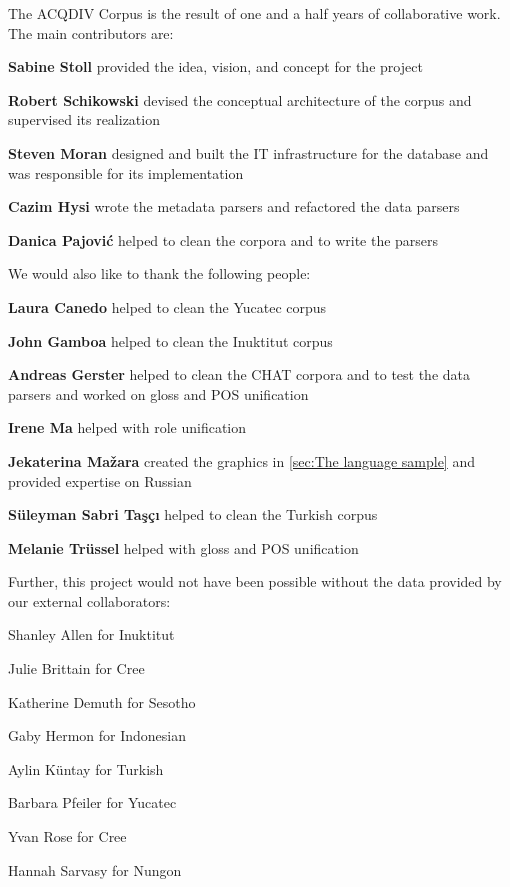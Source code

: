 \documentclass[a4paper, 11pt]{book}
\begin{document}
The ACQDIV Corpus is the result of one and a half years of collaborative work. The main contributors are: 

\begin{itemize*}
	\item \textbf{Sabine Stoll} provided the idea, vision, and concept for the project
	\item \textbf{Robert Schikowski} devised the conceptual architecture of the corpus and supervised its realization 
	\item \textbf{Steven Moran} designed and built the IT infrastructure for the database and was responsible for its implementation
	\item \textbf{Cazim Hysi} wrote the metadata parsers and refactored the data parsers
	\item \textbf{Danica Pajović} helped to clean the corpora and to write the parsers
\end{itemize*}

\noindent We would also like to thank the following people: 

\begin{itemize*}
	\item \textbf{Laura Canedo} helped to clean the Yucatec corpus
	\item \textbf{John Gamboa} helped to clean the Inuktitut corpus
	\item \textbf{Andreas Gerster} helped to clean the CHAT corpora and to test the data parsers and worked on gloss and POS unification
	\item \textbf{Irene Ma} helped with role unification
	\item \textbf{Jekaterina Mažara} created the graphics in \autoref{sec:The language sample} and provided expertise on Russian
	\item \textbf{Süleyman Sabri Taşçı} helped to clean the Turkish corpus
	\item \textbf{Melanie Trüssel} helped with gloss and POS unification
\end{itemize*}

Further, this project would not have been possible without the data provided by our external collaborators: 

\begin{itemize*}
	\item Shanley Allen for Inuktitut
	\item Julie Brittain for Cree
	\item Katherine Demuth for Sesotho
	\item Gaby Hermon for Indonesian
	\item Aylin Küntay for Turkish
	\item Barbara Pfeiler for Yucatec
	\item Yvan Rose for Cree
	\item Hannah Sarvasy for Nungon
\end{itemize*}
\end{document}
